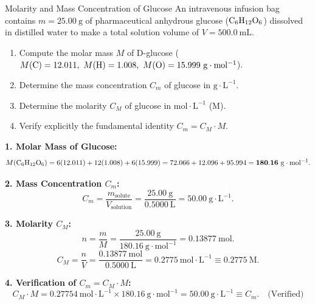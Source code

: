 \begin{exercise}{Molarity and Mass Concentration of Glucose}
An intravenous infusion bag contains $m = 25.00\ \mathrm{g}$ of pharmaceutical anhydrous glucose ($\ce{C6H12O6}$) dissolved in distilled water to make a total solution volume of $V = 500.0\ \mathrm{mL}$.
\begin{enumerate}[leftmargin=1.5em,itemsep=2pt]
  \item Compute the molar mass $M$ of D-glucose ($M(\ce{C}) = 12.011,\ M(\ce{H}) = 1.008,\ M(\ce{O}) = 15.999\ \mathrm{g\cdot mol^{-1}}$).
  \item Determine the mass concentration $C_m$ of glucose in $\mathrm{g\cdot L^{-1}}$.
  \item Determine the molarity $C_M$ of glucose in $\mathrm{mol\cdot L^{-1}}$ ($\mathrm{M}$).
  \item Verify explicitly the fundamental identity $C_m = C_M \cdot M$.
\end{enumerate}
\end{exercise}

\begin{tabletworkspace}[5.0cm]
\end{tabletworkspace}

\begin{solution}
\textbf{1. Molar Mass of Glucose:}
\[
M(\ce{C6H12O6}) = 6(12.011) + 12(1.008) + 6(15.999) = 72.066 + 12.096 + 95.994 = \mathbf{180.16\ \mathrm{g\cdot mol^{-1}}}.
\]

\textbf{2. Mass Concentration $C_m$:}
\[
C_m = \frac{m_{\text{solute}}}{V_{\text{solution}}} = \frac{25.00\ \mathrm{g}}{0.5000\ \mathrm{L}} = \mathbf{50.00\ \mathrm{g\cdot L^{-1}}}.
\]

\textbf{3. Molarity $C_M$:}
\[
n = \frac{m}{M} = \frac{25.00\ \mathrm{g}}{180.16\ \mathrm{g\cdot mol^{-1}}} = 0.13877\ \mathrm{mol}.
\]
\[
C_M = \frac{n}{V} = \frac{0.13877\ \mathrm{mol}}{0.5000\ \mathrm{L}} = \mathbf{0.2775\ \mathrm{mol\cdot L^{-1}} \equiv 0.2775\ \mathrm{M}}.
\]

\textbf{4. Verification of $C_m = C_M \cdot M$:}
\[
C_M \cdot M = 0.27754\ \mathrm{mol\cdot L^{-1}} \times 180.16\ \mathrm{g\cdot mol^{-1}} = \mathbf{50.00\ \mathrm{g\cdot L^{-1}}} \equiv C_m. \quad \text{(Verified)}
\]
\end{solution}

